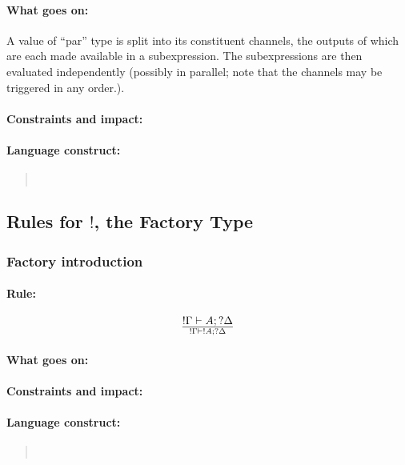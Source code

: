 \documentclass[a4paper]{article}
\begin{document}
\paragraph{What goes on:} A value of ``par'' type is split into its
constituent channels, the outputs of which are each made available in
a subexpression. The subexpressions are then evaluated independently
(possibly in parallel; note that the channels may be triggered in any order.).

\paragraph{Constraints and impact:}
\paragraph{Language construct:}
\begin{quote}\tt
\end{quote}


\subsection{Rules for $!$, the Factory Type}

\subsubsection{Factory introduction}


\paragraph{Rule:}
$$
{
  !\Gamma \vdash A; ?\Delta
}\over{
  !\Gamma \vdash !A; ?\Delta
}
$$
\paragraph{What goes on:}
\paragraph{Constraints and impact:}
\paragraph{Language construct:}
\begin{quote}\tt
\end{quote}
\end{document}

